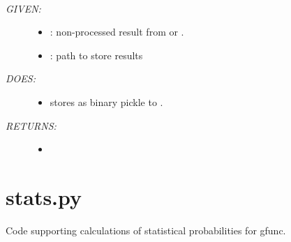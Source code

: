 \documentclass[letterpaper,10pt,english]{sphinxmanual}
\begin{document}
\begin{fulllineitems}
\label{code:gfunc.motifs.save_MOODS_result}~\begin{description}
\item[{\emph{GIVEN:}}] \leavevmode\begin{itemize}
\item {} 
: non-processed result from  or .

\item {} 
: path to store results

\end{itemize}

\item[{\emph{DOES:}}] \leavevmode\begin{itemize}
\item {} 
stores  as binary pickle to .

\end{itemize}

\item[{\emph{RETURNS:}}] \leavevmode\begin{itemize}
\item {} 

\end{itemize}

\end{description}

\end{fulllineitems}

\label{code:module-gfunc.stats}

\section{stats.py}
\label{code:stats-py}
Code supporting calculations of statistical probabilities for gfunc.
\end{document}
